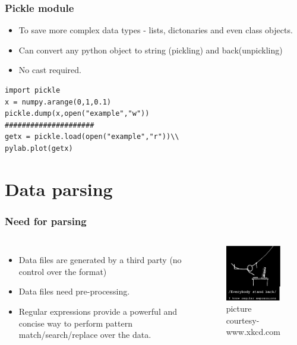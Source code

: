 \documentclass[xcolor=table]{beamer}
\begin{document}
\begin{frame}[fragile]
\frametitle{Pickle module}
\begin{itemize}
\item To save more complex data types - lists, dictonaries and even class objects.     
\item Can convert any python object to string (pickling) and back(unpickling)  
\item No cast required. 
\end{itemize}
\tiny
\vspace{1mm}
\begin{verbatim}
import pickle 
x = numpy.arange(0,1,0.1)
pickle.dump(x,open("example","w"))
#####################
getx = pickle.load(open("example","r"))\\
pylab.plot(getx) 
\end{verbatim}

\end{frame}


\section{Data parsing}
\begin{frame}
\frametitle{Need for parsing}
\begin{columns}
\column{2.0in}
\begin{itemize}
\item Data files are generated by a third party (no control over the format)
\item Data files need pre-processing.
\item Regular expressions provide a powerful and concise way to perform pattern match/search/replace over the data. 
\end{itemize}
\column{2.0in}
\begin{figure}
    \centering
    \includegraphics[width=2.0in]{regex.eps}
\caption{\tiny{picture courtesy- www.xkcd.com} }
\end{figure}
\end{columns}
\end{frame}
\end{document}
